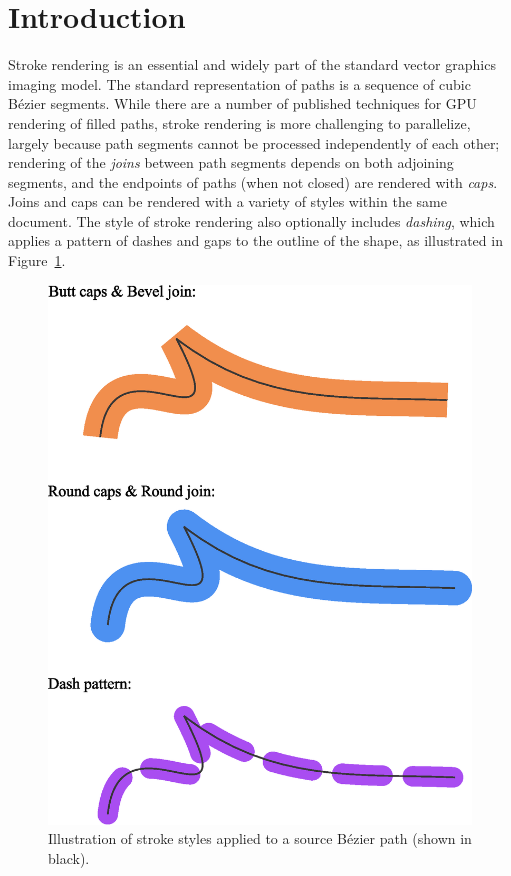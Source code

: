\documentclass[sigconf, nonacm]{acmart}
\begin{document}
\section{Introduction}

Stroke rendering is an essential and widely part of the standard vector graphics imaging model. The standard representation of paths is a sequence of cubic Bézier segments. While there are a number of published techniques for GPU rendering of filled paths, stroke rendering is more challenging to parallelize, largely because path segments cannot be processed independently of each other; rendering of the \emph{joins} between path segments depends on both adjoining segments, and the endpoints of paths (when not closed) are rendered with \emph{caps}. Joins and caps can be rendered with a variety of styles within the same document. The style of stroke rendering also optionally includes \emph{dashing}, which applies a pattern of dashes and gaps to the outline of the shape, as illustrated in Figure~\ref{fig:stroke_styles}.

\begin{figure}
    \vspace{15pt}
    \includegraphics[scale=0.4]{stroke_styles}
    \caption{Illustration of stroke styles applied to a source Bézier path (shown in black).}
    \label{fig:stroke_styles}
\end{figure}
\end{document}
